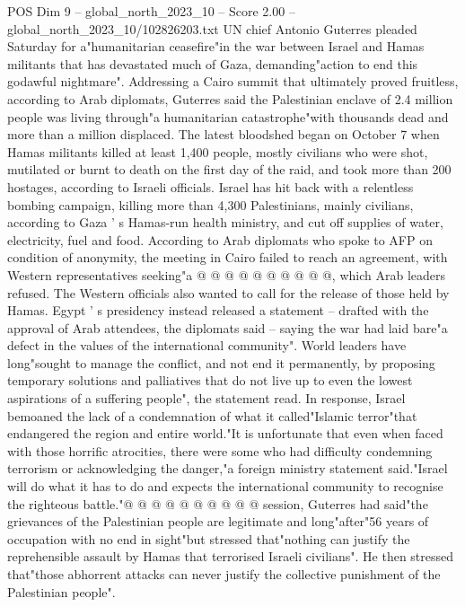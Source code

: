 \begin{textsample}{POS Dim 9 – global\_north\_2023\_10 – Score 2.00 – global\_north\_2023\_10/102826203.txt}  \label{ex:f9_pos_409}
UN chief Antonio Guterres pleaded Saturday for a"humanitarian ceasefire"in the war between Israel and Hamas militants that has devastated much of Gaza, demanding"action to end this godawful nightmare".
Addressing a Cairo summit that ultimately proved fruitless, according to Arab diplomats, Guterres said the Palestinian enclave of 2.4 million people was living through"a humanitarian catastrophe"with thousands dead and more than a million displaced.
The latest bloodshed began on October 7 when Hamas militants killed at least 1,400 people, mostly civilians who were shot, mutilated or burnt to death on the first day of the raid, and took more than 200 hostages, according to Israeli officials.
Israel has hit back with a relentless bombing campaign, killing more than 4,300 Palestinians, mainly civilians, according to Gaza ' s Hamas-run health ministry, and cut off supplies of water, electricity, fuel and food.
According to Arab diplomats who spoke to AFP on condition of anonymity, the meeting in Cairo failed to reach an agreement, with Western representatives seeking"a @ @ @ @ @ @ @ @ @ @, which Arab leaders refused.
The Western officials also wanted to call for the release of those held by Hamas.
Egypt ' s presidency instead released a statement -- drafted with the approval of Arab attendees, the diplomats said -- saying the war had laid bare"a defect in the values of the international community".
World leaders have long"sought to manage the conflict, and not end it permanently, by proposing temporary solutions and palliatives that do not live up to even the lowest aspirations of a suffering people", the statement read.
In response, Israel bemoaned the lack of a condemnation of what it called"Islamic terror"that endangered the region and entire world."It is unfortunate that even when faced with those horrific atrocities, there were some who had difficulty condemning terrorism or acknowledging the danger,"a foreign ministry statement said."Israel will do what it has to do and expects the international community to recognise the righteous battle."@ @ @ @ @ @ @ @ @ @ session, Guterres had said"the grievances of the Palestinian people are legitimate and long"after"56 years of occupation with no end in sight"but stressed that"nothing can justify the reprehensible assault by Hamas that terrorised Israeli civilians".
He then stressed that"those abhorrent attacks can never justify the collective punishment of the Palestinian people".

\end{textsample}
